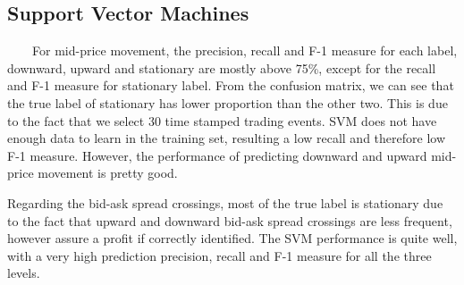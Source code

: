 \documentclass[11pt]{article}
\begin{document}
\subsection{Support Vector Machines}
\ \ \ \ For mid-price movement, the precision, recall and F-1 measure for each label, downward, upward and stationary are mostly above 75\%, except for the recall and F-1 measure for stationary label. From the confusion matrix, we can see that the true label of stationary has lower proportion than the other two. This is due to the fact that we select 30 time stamped trading events. SVM does not have enough data to learn in the training set, resulting a low recall and therefore low F-1 measure. However, the performance of predicting downward and upward mid-price movement is pretty good.
\par
Regarding the bid-ask spread crossings, most of the true label is stationary due to the fact that upward and downward bid-ask spread crossings are less frequent, however assure a profit if correctly identified. The SVM performance is quite well, with a very high prediction precision, recall and F-1 measure for all the three levels. 
\begin{table} [!htb]
  \small
\caption{SVM: Mid-Price Movement Confusion Matrix}
\centering
{}
  \end{table}
    \begin{table} [!htb]
\caption{SVM: Mid-Price Movement Measures}
\centering
{}
  \end{table}
\end{document}
